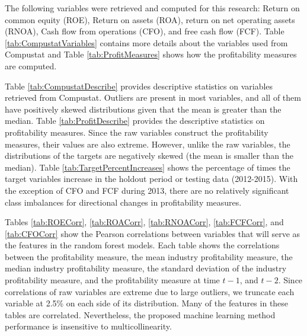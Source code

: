The following variables were retrieved and computed for this research: Return on common equity (ROE),  Return on assets (ROA), return on net operating assets (RNOA), Cash flow from operations (CFO),  and free cash flow (FCF).  Table \ref{tab:CompustatVariables} contains more details about the variables used from Compustat and Table \ref{tab:ProfitMeasures} shows how the profitability measures are computed.   


Table \ref{tab:CompustatDescribe} provides descriptive statistics on variables retrieved from Compustat. Outliers are present in most variables, and all of them have positively skewed distributions given that the mean is greater than the median. Table \ref{tab:ProfitDescribe} provides the descriptive statistics on profitability measures.  Since the raw variables construct the profitability measures, their values are also extreme.  However, unlike the raw variables, the distributions of the targets are negatively skewed (the mean is smaller than the median).  Table \ref{tab:TargetPercentIncreases} shows the percentage of times the target variables increase in the holdout period or testing data (2012-2015).   With the exception of CFO and FCF during 2013,  there are no relatively significant class imbalances for directional changes in profitability measures. 

Tables \ref{tab:ROECorr},  \ref{tab:ROACorr},  \ref{tab:RNOACorr},  \ref{tab:FCFCorr}, and \ref{tab:CFOCorr} show the Pearson correlations between variables that will serve as the features in the random forest models.  Each table shows the correlations between the profitability measure, the mean industry profitability measure, the median industry profitability measure, the standard deviation of the industry profitability measure,  and the profitability measure at time \(t-1\),  and \(t-2\).  Since correlations of raw variables are extreme due to large outliers, we truncate each variable at 2.5\% on each side of its distribution.  Many of the features in these tables are correlated. Nevertheless, the proposed machine learning method performance is insensitive to multicollinearity.   %


